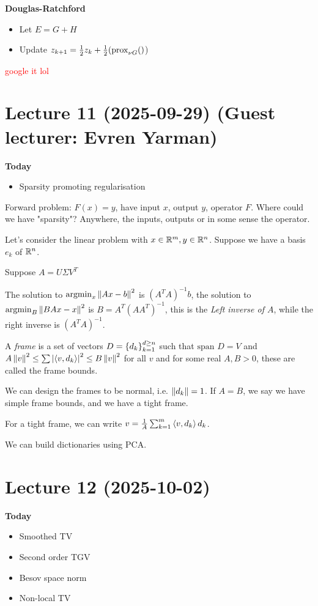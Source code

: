 \documentclass[12pt]{article}
\begin{document}
\textbf{Douglas-Ratchford}
\begin{itemize}
    \item Let $E=G+H$
    \item Update $z_{k+1} = \frac{1}{2}z_k + \frac{1}{2}(\operatorname{prox}_{\nu G}()$)
\end{itemize}

\textcolor{red}{google it lol}


\newpage
\section{Lecture 11 (2025-09-29) (Guest lecturer: Evren Yarman)}
\textbf{Today}
\begin{itemize}
    \item Sparsity promoting regularisation
\end{itemize}

Forward problem: $F(x)=y$, have input $x$, output $y$, operator $F$. Where could we have "sparsity"? Anywhere, the inputs, outputs or in some sense the operator.

Let's consider the linear problem with $x\in\mathbb{R}^m,y\in\mathbb{R}^n$. Suppose we have a basis ${e_k}$ of $\mathbb{R}^n$. 

Suppose $A= U\Sigma V^T$

The solution to $\operatorname{argmin}_x \left\lVert Ax-b\right\rVert^2$ is $(A^TA)^{-1}b$, the solution to $\operatorname{argmin}_B \left\lVert BAx-x\right\rVert^2$ is $B=A^T(AA^T)^{-1}$, this is the \textit{Left inverse of $A$}, while the right inverse is $(A^TA)^{-1}$.

\begin{definition}
    A \textit{frame} is a set of vectors $D=\left\{d_k\right\}_{k=1}^{d\geq n}$ such that $  \text{span } D = V$ and $A\left\lVert v\right\rVert^2\leq \sum \left|\left\langle v, d_k\right\rangle\right|^2 \leq B\left\lVert v\right\rVert^2$ for all $v$ and for some real $A,B>0$, these are called the frame bounds.
\end{definition}

We can design the frames to be normal, i.e. $\left\lVert d_k\right\rVert=1$. If $A=B$, we say we have simple frame bounds, and we have a tight frame.

For a tight frame, we can write $v=\frac{1}{A}\sum_{k=1}^m \left\langle v, d_k\right\rangle d_k$. 

We can build dictionaries using PCA.


\newpage
\section{Lecture 12 (2025-10-02)}
\textbf{Today}
\begin{itemize}
    \item Smoothed TV
    \item Second order TGV
    \item Besov space norm
    \item Non-local TV
\end{itemize}
\end{document}
